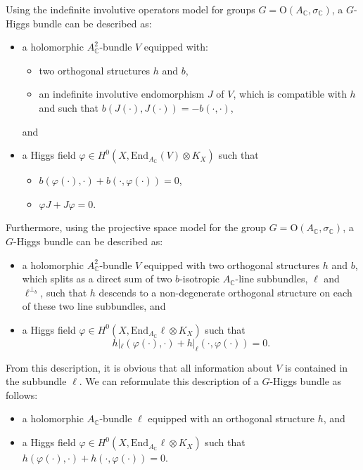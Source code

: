 \documentclass[oneside,11pt]{amsart}
\theoremstyle{definition}
\theoremstyle{remark}
\numberwithin{thm}{section}
\numberwithin{equation}{section}
\begin{document}
Using the indefinite involutive operators model for groups $G=\mathrm{O}(A_{\mathbb{C}}, \sigma_{\mathbb{C}})$, a $G$-Higgs bundle can be described as: 
\begin{itemize}
    \item a holomorphic $A^2_{\mathbb{C}}$-bundle $V$ equipped with: 
    \begin{itemize}
        \item two orthogonal structures $h$ and $b$,
        \item an indefinite involutive endomorphism $J$ of $V$, which is compatible with $h$ and such that $b(J(\cdot),J(\cdot))=-b(\cdot,\cdot)$,
    \end{itemize}
    and
    \item a Higgs field $\varphi\in H^0(X,\mathrm{End}_{A_\mathbb C}(V)\otimes K_X)$ such that 
    \begin{itemize}
        \item $b(\varphi(\cdot),\cdot)+b(\cdot,\varphi(\cdot))=0$, 
        \item $\varphi J+J\varphi=0$.
        \end{itemize}
\end{itemize}

Furthermore, using the projective space model for the group $G=\mathrm{O}(A_{\mathbb{C}}, \sigma_{\mathbb{C}})$, a $G$-Higgs bundle can be described as: 
\begin{itemize}
    \item a holomorphic $A^2_{\mathbb{C}}$-bundle $V$ equipped with two orthogonal structures $h$ and $b$,
    which splits as a direct sum of two $b$-isotropic $A_{\mathbb{C}}$-line subbundles, $\ell$ and $\ell^{\perp_{b}}$, such that $h$ descends to a non-degenerate orthogonal structure on each of these two line subbundles, and
    \item a Higgs field $\varphi\in H^0(X,\mathrm{End}_{A_\mathbb C}\ell\otimes K_X)$ such that 
    $$h|_{\ell}(\varphi(\cdot),\cdot)+h|_{\ell}(\cdot,\varphi(\cdot))=0.$$ 
\end{itemize}
From this description, it is obvious that all information about $V$ is contained in the subbundle $\ell$. We can reformulate this description of a $G$-Higgs bundle as follows: 
\begin{itemize}
    \item a holomorphic $A_{\mathbb{C}}$-bundle $\ell$ equipped with an orthogonal structure $h$, and
    \item a Higgs field $\varphi\in H^0(X,\mathrm{End}_{A_\mathbb C}\ell\otimes K_X)$ such that $h(\varphi(\cdot),\cdot)+h(\cdot,\varphi(\cdot))=0.$ 
\end{itemize}
\end{document}
